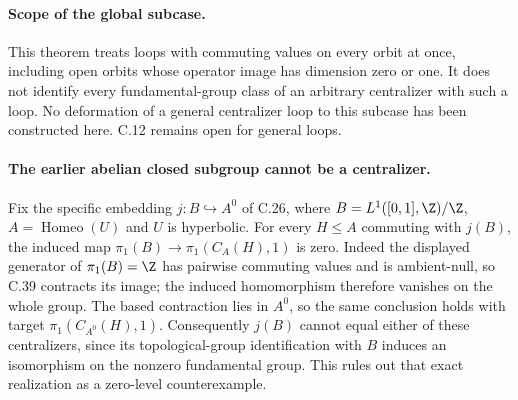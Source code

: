 \paragraph{Scope of the global subcase.}
This theorem treats loops with commuting values on
every orbit at once, including open orbits whose
operator image has dimension zero or one.
It does not identify every fundamental-group class
of an arbitrary centralizer with such a loop.
No deformation of a general centralizer loop to
this subcase has been constructed here.
C.12 remains open for general loops.

\paragraph{The earlier abelian closed subgroup cannot be a centralizer.}
Fix the specific embedding $j:B\hookrightarrow A^0$ of C.26, where
$B=L^1([0,1],\Z)/\Z$, $A=\operatorname{Homeo}(U)$ and $U$ is
hyperbolic. For every $H\leq A$ commuting with $j(B)$, the induced map
$\pi_1(B)\to\pi_1(C_A(H),1)$ is zero. Indeed the displayed generator
of $\pi_1(B)=\Z$ has pairwise commuting values and is ambient-null,
so C.39 contracts its image; the induced homomorphism therefore
vanishes on the whole group. The based contraction lies in $A^0$,
so the same conclusion holds with target $\pi_1(C_{A^0}(H),1)$.
Consequently $j(B)$ cannot equal either of these centralizers,
since its topological-group identification with $B$ induces an
isomorphism on the nonzero fundamental group. This rules out that
exact realization as a zero-level counterexample.
